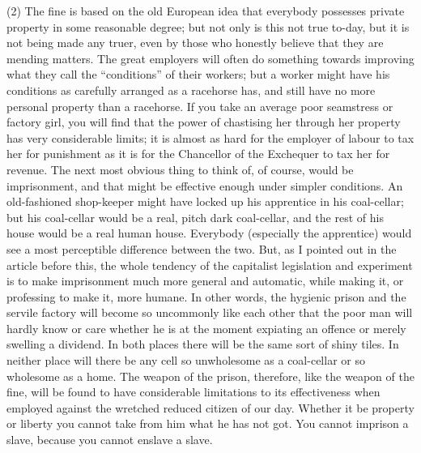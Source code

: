 \documentclass{book}
\begin{document}
(2) The fine is based on the old European idea that everybody possesses private property in some reasonable degree; but not only is this not true to-day, but it is not being made any truer, even by those who honestly believe that they are mending matters. The great employers will often do something towards improving what they call the “conditions” of their workers; but a worker might have his conditions as carefully arranged as a racehorse has, and still have no more personal property than a racehorse. If you take an average poor seamstress or factory girl, you will find that the power of chastising her through her property has very considerable limits; it is almost as hard for the employer of labour to tax her for punishment as it is for the Chancellor of the Exchequer to tax her for revenue. The next most obvious thing to think of, of course, would be imprisonment, and that might be effective enough under simpler conditions. An old-fashioned shop-keeper might have locked up his apprentice in his coal-cellar; but his coal-cellar would be a real, pitch dark coal-cellar, and the rest of his house would be a real human house. Everybody (especially the apprentice) would see a most perceptible difference between the two. But, as I pointed out in the article before this, the whole tendency of the capitalist legislation and experiment is to make imprisonment much more general and automatic, while making it, or professing to make it, more humane. In other words, the hygienic prison and the servile factory will become so uncommonly like each other that the poor man will hardly know or care whether he is at the moment expiating an offence or merely swelling a dividend. In both places there will be the same sort of shiny tiles. In neither place will there be any cell so unwholesome as a coal-cellar or so wholesome as a home. The weapon of the prison, therefore, like the weapon of the fine, will be found to have considerable limitations to its effectiveness when employed against the wretched reduced citizen of our day. Whether it be property or liberty you cannot take from him what he has not got. You cannot imprison a slave, because you cannot enslave a slave.
\end{document}

